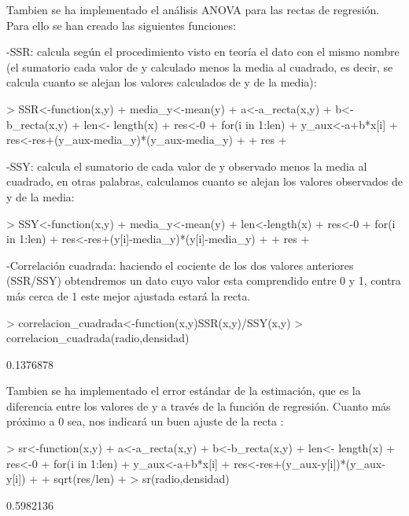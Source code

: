 \documentclass [a4paper] {article}
\begin{document}
Tambien se ha implementado el análisis ANOVA para las rectas de regresión. Para ello se han creado las siguientes funciones:

-SSR: calcula según el procedimiento visto en teoría el dato con el mismo nombre (el sumatorio cada valor de y calculado menos la media 
al cuadrado, es decir, se calcula cuanto se alejan los valores calculados de y de la media):

\begin{Schunk}
\begin{Sinput}
> SSR<-function(x,y){
+ 	media_y<-mean(y)
+ 	a<-a_recta(x,y)
+ 	b<-b_recta(x,y)
+ 	len<- length(x)
+ 	res<-0
+ 	for(i in 1:len){
+ 		y_aux<-a+b*x[i]
+ 		res<-res+(y_aux-media_y)*(y_aux-media_y)
+ 	}
+ 	res
+ }
\end{Sinput}
\end{Schunk}

-SSY: calcula el sumatorio de cada valor de y observado menos la media al cuadrado, en otras palabras, calculamos cuanto se alejan los valores
observados de y de la media:

\begin{Schunk}
\begin{Sinput}
> SSY<-function(x,y){
+ 	media_y<-mean(y)
+ 	len<-length(x)
+ 	res<-0
+ 	for(i in 1:len){
+ 		res<-res+(y[i]-media_y)*(y[i]-media_y)
+ 	}
+ 	res
+ }
\end{Sinput}
\end{Schunk}

-Correlación cuadrada: haciendo el cociente de los dos valores anteriores (SSR/SSY) obtendremos un dato cuyo valor
esta comprendido entre 0 y 1, contra más cerca de 1 este mejor ajustada estará la recta.

\begin{Schunk}
\begin{Sinput}
> correlacion_cuadrada<-function(x,y){SSR(x,y)/SSY(x,y)}
> correlacion_cuadrada(radio,densidad)
\end{Sinput}
\begin{Soutput}
[1] 0.1376878
\end{Soutput}
\end{Schunk}

Tambien se ha implementado el error estándar de la estimación, que es la diferencia entre los valores de y
a través de la función de regresión. Cuanto más próximo a 0 sea, nos indicará un buen ajuste de la recta :

\begin{Schunk}
\begin{Sinput}
> sr<-function(x,y){
+ 	a<-a_recta(x,y)
+ 	b<-b_recta(x,y)
+ 	len<- length(x)
+ 	res<-0
+ 	for(i in 1:len){
+ 		y_aux<-a+b*x[i]
+ 		res<-res+(y_aux-y[i])*(y_aux-y[i])
+ 	}
+ 	sqrt(res/len)
+ }
> sr(radio,densidad)
\end{Sinput}
\begin{Soutput}
[1] 0.5982136
\end{Soutput}
\end{Schunk}
\end{document}
